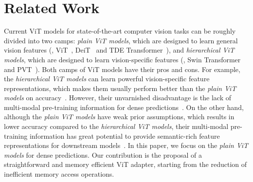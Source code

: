 \section{Related Work}
Current ViT models for state-of-the-art computer vision tasks can be roughly divided into two camps: \emph{plain ViT models}, which are designed to learn general vision features (\eg, ViT~\citep{dosovitskiy2020image}, DeiT~\citep{touvron2021training} and TDE Transformer~\citep{touvron2021training}), and \emph{hierarchical ViT models}, which are designed to learn vision-specific features (\eg, Swin Transformer~\citep{liu2021swin} and PVT~\citep{wang2021pyramid}). Both camps of ViT models have their pros and cons. 
%
For example, the \emph{hierarchical ViT models} can learn powerful vision-specific feature representations, which makes them usually perform better than the \emph{plain ViT models} on accuracy~\citep{han2022survey,khan2022transformers,Kirillov_2023_ICCV}. However, their unvarnished disadvantage is the lack of multi-modal pre-training information for dense predictions~\citep{chen2022vision}. On the other hand, although the \emph{plain ViT models} have weak prior assumptions, which results in lower accuracy compared to the \emph{hierarchical ViT models}, their multi-modal pre-training information has great potential to provide semantic-rich feature representations for downstream models~\citep{guo2022attention,zhang2023cae,he2022masked,zhang2024boundary,jia2022visual}. In this paper, we focus on the \emph{plain ViT models} for dense predictions. Our contribution is the proposal of a straightforward and memory efficient ViT adapter, starting from the reduction of inefficient memory access operations.

